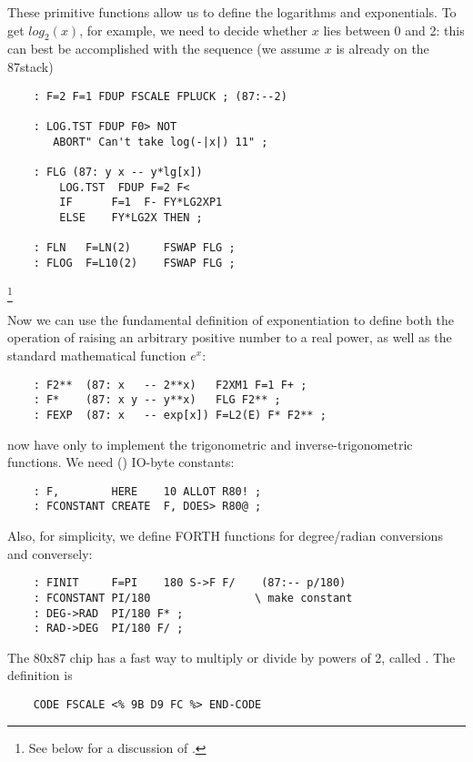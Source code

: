 These primitive functions allow us to define the logarithms and exponentials. To get $log_{2}(x)$, for example, we need to decide whether $x$ lies between 0 and 2: this can best be accomplished with
the sequence (we assume $x$ is already on the 87stack)

\begin{lstlisting}
    : F=2 F=1 FDUP FSCALE FPLUCK ; (87:--2)

    : LOG.TST FDUP F0> NOT
       ABORT" Can't take log(-|x|) 11" ;

    : FLG (87: y x -- y*lg[x])
        LOG.TST  FDUP F=2 F<
        IF      F=1  F- FY*LG2XP1
        ELSE    FY*LG2X THEN ;

    : FLN   F=LN(2)     FSWAP FLG ;
    : FLOG  F=L10(2)    FSWAP FLG ;
\end{lstlisting} \footnote{See below for a discussion of .}

Now we can use the fundamental definition of exponentiation to define both the operation of raising an arbitrary positive number to a real power, as well as the standard mathematical function $e^x$:

\begin{lstlisting}
    : F2**  (87: x   -- 2**x)   F2XM1 F=1 F+ ;
    : F*    (87: x y -- y**x)   FLG F2** ;
    : FEXP  (87: x   -- exp[x]) F=L2(E) F* F2** ;
\end{lstlisting}

 now have only to implement the trigonometric and inverse-trigonometric functions. We need () IO-byte constants:

\begin{lstlisting}
    : F,        HERE    10 ALLOT R80! ;
    : FCONSTANT CREATE  F, DOES> R80@ ;
\end{lstlisting}

Also, for simplicity, we define FORTH functions for degree/radian conversions and conversely:

\begin{lstlisting}
    : FINIT     F=PI    180 S->F F/    (87:-- p/180)
    : FCONSTANT PI/180                \ make constant
    : DEG->RAD  PI/180 F* ;
    : RAD->DEG  PI/180 F/ ;
\end{lstlisting}


The 80x87 chip has a fast way to multiply or divide by powers of 2, called . The  definition is

\begin{lstlisting}
    CODE FSCALE <% 9B D9 FC %> END-CODE
\end{lstlisting}

